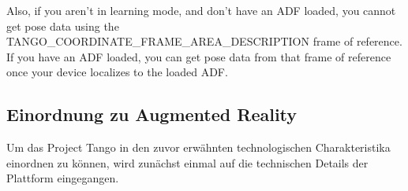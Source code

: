 Also, if you aren't in learning mode, and don't have an ADF loaded, you cannot get pose data using the TANGO_COORDINATE_FRAME_AREA_DESCRIPTION frame of reference. If you have an ADF loaded, you can get pose data from that frame of reference once your device localizes to the loaded ADF.

\subsection{Einordnung zu Augmented Reality}

Um das Project Tango in den zuvor erwähnten technologischen Charakteristika einordnen zu können, wird zunächst einmal auf die technischen Details der Plattform eingegangen. \\

